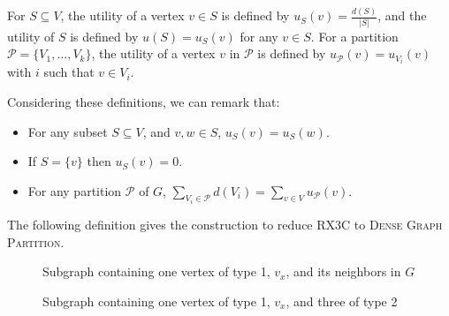 \documentclass[a4paper,USenglish,cleveref, autoref]{lipics-v2021}
\newcommand\DGP{\textsc{Dense Graph Partition}}
\begin{document}
\begin{definition}
For $S \subseteq V$, the utility of a vertex  $v \in S$ is defined by  $u_S(v) = \frac{d(S)}{|S|}$, and the utility of $S$ is defined by $u(S)=u_S(v)$ for any $v \in S$. For a partition $\mathcal{P}= \{ V_1, \ldots, V_k\}$, the utility of a vertex $v$ in $\mathcal{P}$ is defined by  $u_{\mathcal{P}}(v)=u_{V_i}(v)$ with $i$ such that $v\in V_i$. 
\end{definition}

 
Considering these definitions, we can remark that:
\begin{itemize} 
\item  For any subset $S \subseteq V$, and $v,w \in S $, $u_S(v)=u_S(w)$.
\item If $S=\{v\}$ then $u_S(v)=0$.
\item  For any partition $\mathcal{P}$ of $G$, $\sum\limits_{V_i \in \mathcal{P}}d(V_i) = \sum\limits_{v \in V}u_{\mathcal{P}}(v)$. 
\end{itemize}
 
  
\noindent
The following definition gives the construction to reduce \textsc{RX3C} to \DGP.


\begin{figure}
\begin{minipage}[c]{0.49\linewidth}
    \centering
\caption{Subgraph containing one vertex of type 1, $v_x$, and its neighbors in $G$}
\label{t1}
\end{minipage}
\begin{minipage}[c]{0.49\linewidth}
    \centering
\caption{Subgraph containing one vertex of type 1, $v_x$, and three of type 2}
\label{t2}
\end{minipage}

\end{figure}
\end{document}
